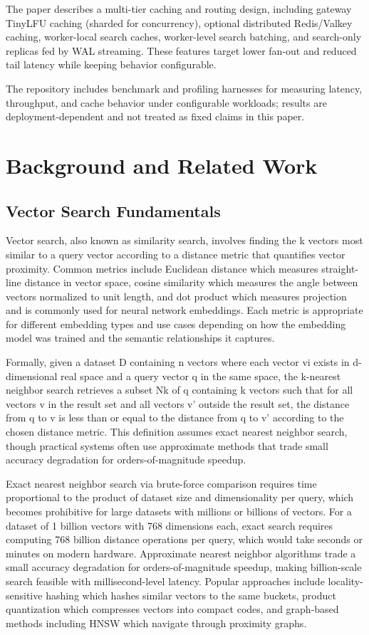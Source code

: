\documentclass[conference]{IEEEtran}
\begin{document}
The paper describes a multi-tier caching and routing design, including gateway TinyLFU caching (sharded for concurrency), optional distributed Redis/Valkey caching, worker-local search caches, worker-level search batching, and search-only replicas fed by WAL streaming. These features target lower fan-out and reduced tail latency while keeping behavior configurable.

The repository includes benchmark and profiling harnesses for measuring latency, throughput, and cache behavior under configurable workloads; results are deployment-dependent and not treated as fixed claims in this paper.

\section{Background and Related Work}

\subsection{Vector Search Fundamentals}

Vector search, also known as similarity search, involves finding the k vectors most similar to a query vector according to a distance metric that quantifies vector proximity. Common metrics include Euclidean distance which measures straight-line distance in vector space, cosine similarity which measures the angle between vectors normalized to unit length, and dot product which measures projection and is commonly used for neural network embeddings. Each metric is appropriate for different embedding types and use cases depending on how the embedding model was trained and the semantic relationships it captures.

Formally, given a dataset D containing n vectors where each vector vi exists in d-dimensional real space and a query vector q in the same space, the k-nearest neighbor search retrieves a subset Nk of q containing k vectors such that for all vectors v in the result set and all vectors v' outside the result set, the distance from q to v is less than or equal to the distance from q to v' according to the chosen distance metric. This definition assumes exact nearest neighbor search, though practical systems often use approximate methods that trade small accuracy degradation for orders-of-magnitude speedup.

Exact nearest neighbor search via brute-force comparison requires time proportional to the product of dataset size and dimensionality per query, which becomes prohibitive for large datasets with millions or billions of vectors. For a dataset of 1 billion vectors with 768 dimensions each, exact search requires computing 768 billion distance operations per query, which would take seconds or minutes on modern hardware. Approximate nearest neighbor algorithms trade a small accuracy degradation for orders-of-magnitude speedup, making billion-scale search feasible with millisecond-level latency. Popular approaches include locality-sensitive hashing \cite{lsh} which hashes similar vectors to the same buckets, product quantization \cite{pq} which compresses vectors into compact codes, and graph-based methods including HNSW which navigate through proximity graphs.
\end{document}
